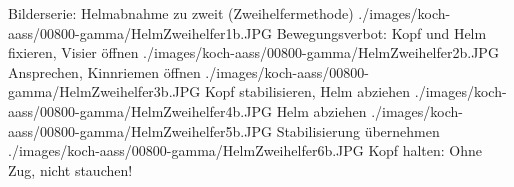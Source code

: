 \begin{PictureSeriesWide}{}{Bilderserie: Helmabnahme zu zweit
(Zweihelfermethode)}
{./images/koch-aass/00800-gamma/HelmZweihelfer1b.JPG}
{Bewegungsverbot: 
Kopf und Helm fixieren, Visier öffnen
 }
{./images/koch-aass/00800-gamma/HelmZweihelfer2b.JPG}
{Ansprechen, Kinnriemen öffnen}
{./images/koch-aass/00800-gamma/HelmZweihelfer3b.JPG}
{Kopf stabilisieren, Helm abziehen}
{}
{}
{./images/koch-aass/00800-gamma/HelmZweihelfer4b.JPG}
{Helm abziehen }
{./images/koch-aass/00800-gamma/HelmZweihelfer5b.JPG}
{Stabilisierung übernehmen}
{./images/koch-aass/00800-gamma/HelmZweihelfer6b.JPG}
{Kopf halten: Ohne Zug, nicht stauchen!
}
{}
{}
\end{PictureSeriesWide}
% 

